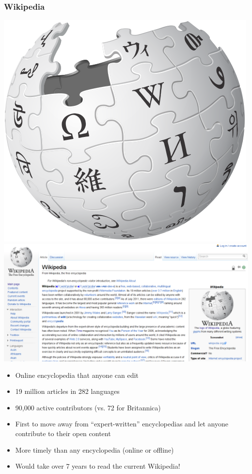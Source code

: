 \documentclass{beamer}
\begin{document}
\begin{frame}
  \frametitle{Wikipedia}
  \begin{center} \includegraphics[height=0.35\textheight]{../img/wikipedia}\hspace{1em} \includegraphics[height=0.35\textheight]{../img/wikiwiki} \end{center}
  
  \begin{itemize}
  \item Online encyclopedia that anyone can edit
  \item 19 million articles in 282 languages
  \item 90,000 active contributors (vs. 72 for Britannica)
  \item First to move away from ``expert-written'' encyclopedias and let anyone contribute to their open content
  \item More timely than any encyclopedia (online or offline)
  \item Would take over 7 years to read the current Wikipedia!
  \end{itemize}
\end{frame}
\end{document}
